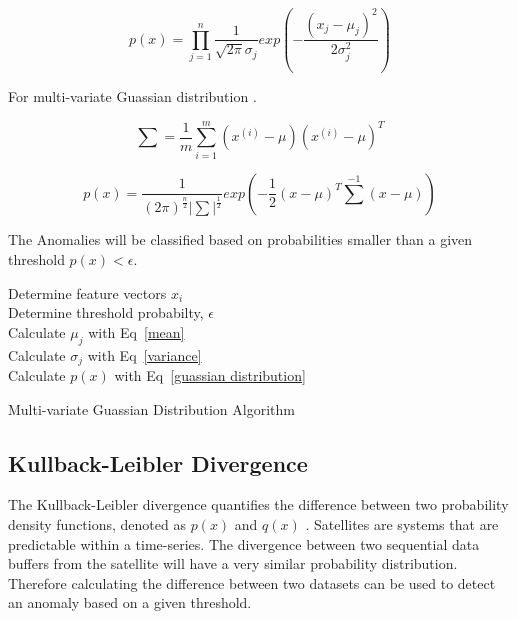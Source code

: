 \begin{equation}
\label{guassian distribution}
p(x) = \prod_{j=1}^{n} \frac{1}{\sqrt{2\pi}\sigma_j}exp(-\frac{(x_j-\mu_j)^2}{2\sigma_j^2})
\end{equation}

For multi-variate Guassian distribution \cite{do2008multivariate}.

\begin{equation}
\label{sum}
\sum = \frac{1}{m}\sum_{i=1}^{m}(x^{(i)}-\mu)(x^{(i)}-\mu)^T
\end{equation}

\begin{equation}
\label{multi-variate guassian distribution}
p(x) = \frac{1}{(2\pi)^{\frac{n}{2}}{\lvert \sum \rvert}^\frac{1}{2}} exp(-\frac{1}{2}(x-\mu)^T{\sum}^{-1}(x-\mu))
\end{equation}

The Anomalies will be classified based on probabilities smaller than a given threshold $p(x) < \epsilon$.

\begin{algorithm}


\Indm
{}
\Indp
\BlankLine

Determine feature vectors $x_i$ \\
Determine threshold probabilty, $\epsilon$ \\
Calculate $\mu_j$ with Eq~\ref{mean} \\
Calculate $\sigma_j$ with Eq~\ref{variance} \\
Calculate $p(x)$ with Eq~\ref{guassian distribution} \\

\caption[Multi-variate Guassian Distribution]{Multi-variate Guassian Distribution Algorithm}
\label{alg}
\end{algorithm}

\subsection{Kullback-Leibler Divergence}
The Kullback-Leibler divergence quantifies the difference between two probability density functions, denoted as $p(x)$ and $q(x)$ \cite{hershey2007approximating}. Satellites are systems that are predictable within a time-series. The divergence between two sequential data buffers from the satellite will have a very similar probability distribution. Therefore calculating the difference between two datasets can be used to detect an anomaly based on a given threshold.

